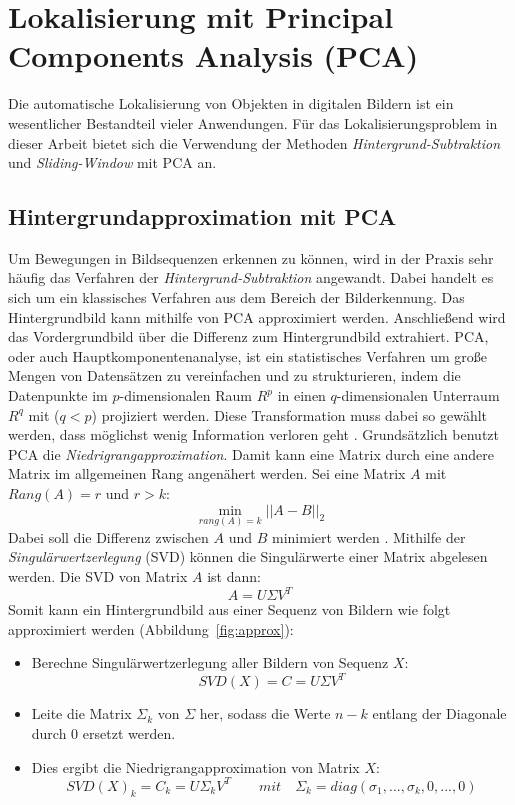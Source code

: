 \section{ Lokalisierung mit Principal Components Analysis (PCA)} \label{sec:PCA}
Die automatische Lokalisierung von Objekten in digitalen Bildern ist ein wesentlicher Bestandteil vieler Anwendungen. 
Für das Lokalisierungsproblem in dieser Arbeit bietet sich die Verwendung der Methoden \textit{Hintergrund-Subtraktion} und \textit{Sliding-Window} mit PCA an.

\subsection{Hintergrundapproximation mit PCA}
Um Bewegungen in Bildsequenzen erkennen zu können, wird in der Praxis sehr häufig das Verfahren der \textit{Hintergrund-Subtraktion} angewandt. Dabei handelt es sich um ein klassisches Verfahren aus dem Bereich der Bilderkennung. Das Hintergrundbild kann mithilfe von PCA approximiert werden. Anschließend wird das Vordergrundbild über die Differenz zum Hintergrundbild extrahiert. PCA, oder auch Hauptkomponentenanalyse, ist ein statistisches Verfahren um große Mengen von Datensätzen zu vereinfachen und zu strukturieren, indem die Datenpunkte im $p$-dimensionalen Raum $R^p$ in einen $q$-dimensionalen Unterraum ${R} ^{q}$ mit ($q<p$) projiziert werden. Diese Transformation muss dabei so gewählt werden, dass möglichst wenig Information verloren geht \cite{Verbeke2007APT}.
Grundsätzlich benutzt PCA die \textit{Niedrigrangapproximation}. Damit kann eine Matrix durch eine andere Matrix im allgemeinen Rang angenähert werden. Sei eine Matrix $A$ mit $Rang(A) = r$ und $r > k$:
\begin{equation}
\min_{rang(A)=k}||A-B||_2 
\end{equation}
Dabei soll die Differenz zwischen $A$ und $B$ minimiert werden \cite{MARKOVSKY2008891}. Mithilfe der \textit{Singulärwertzerlegung} (SVD) können die Singulärwerte einer Matrix abgelesen werden. Die SVD von Matrix $A$ ist dann:
\begin{equation}
A = U \Sigma V^T
\end{equation}
Somit kann ein Hintergrundbild aus einer Sequenz von Bildern wie folgt approximiert werden (Abbildung~\ref{fig:approx}):
\begin{itemize}
\item{Berechne Singulärwertzerlegung aller Bildern von Sequenz $X$:}
\begin{equation}
SVD(X)= C = U \Sigma V^T
\end{equation}
\item{Leite die Matrix ${\Sigma_k}$ von ${\Sigma}$ her, sodass die Werte ${n - k}$  entlang der Diagonale durch 0 ersetzt werden.}
\item{Dies ergibt die Niedrigrangapproximation von Matrix $X$:}
\begin{equation}
SVD(X)_k=C_k = U\Sigma_kV^T \quad\quad mit  \quad  \Sigma_k = diag(\sigma_1, ..., \sigma_k,0,...,0)
\end{equation}
\end{itemize}

